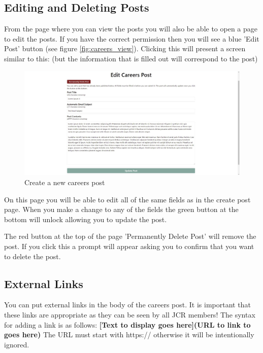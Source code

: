 \documentclass{article}
\begin{document}
\subsection{Editing and Deleting Posts}
From the page where you can view the posts you will also be able to open a page to edit the posts. If you have the correct permission then you will see a blue 'Edit Post' button (see figure \ref{fig:careers_view}). Clicking this will present a screen similar to this: (but the information that is filled out will correspond to the post)
\begin{figure}[H]
    \centering
    \includegraphics[width=\textwidth,height=\textheight,keepaspectratio]{careers/careers_edit.png}
    \caption{Create a new careers post}
    \label{fig:careers_edit}
\end{figure}
On this page you will be able to edit all of the same fields as in the create post page. When you make a change to any of the fields the green button at the bottom will unlock allowing you to update the post.

The red button at the top of the page 'Permanently Delete Post' will remove the post. If you click this a prompt will appear asking you to confirm that you want to delete the post.

\subsection{External Links}
You can put external links in the body of the careers post. It is important that these links are appropriate as they can be seen by all JCR members! The syntax for adding a link is as follows:
\newline
\newline
\textbf{[Text to display goes here](URL to link to goes here)}
\newline
\newline
The URL must start with https:// otherwise it will be intentionally ignored.
\end{document}
